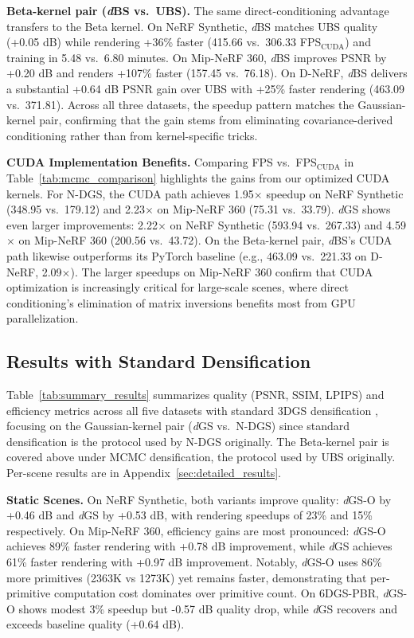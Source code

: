 \documentclass{article}
\newcommand{\dgs}{\textit{d}GS\xspace}
\newcommand{\dbs}{\textit{d}BS\xspace}
\theoremstyle{plain}
\theoremstyle{definition}
\theoremstyle{remark}
\begin{document}
\textbf{Beta-kernel pair (\dbs{} vs.\ UBS).} The same direct-conditioning advantage transfers to the Beta kernel. On NeRF Synthetic, \dbs{} matches UBS quality (+0.05 dB) while rendering +36\% faster (415.66 vs.\ 306.33 FPS$_{\text{CUDA}}$) and training in 5.48 vs.\ 6.80 minutes. On Mip-NeRF 360, \dbs{} improves PSNR by +0.20 dB and renders +107\% faster (157.45 vs.\ 76.18). On D-NeRF, \dbs{} delivers a substantial +0.64 dB PSNR gain over UBS with +25\% faster rendering (463.09 vs.\ 371.81). Across all three datasets, the speedup pattern matches the Gaussian-kernel pair, confirming that the gain stems from eliminating covariance-derived conditioning rather than from kernel-specific tricks.

\textbf{CUDA Implementation Benefits.} Comparing FPS vs.\ FPS$_{\text{CUDA}}$ in Table~\ref{tab:mcmc_comparison} highlights the gains from our optimized CUDA kernels. For N-DGS, the CUDA path achieves 1.95$\times$ speedup on NeRF Synthetic (348.95 vs.\ 179.12) and 2.23$\times$ on Mip-NeRF 360 (75.31 vs.\ 33.79). \dgs{} shows even larger improvements: 2.22$\times$ on NeRF Synthetic (593.94 vs.\ 267.33) and 4.59$\times$ on Mip-NeRF 360 (200.56 vs.\ 43.72). On the Beta-kernel pair, \dbs{}'s CUDA path likewise outperforms its PyTorch baseline (e.g., 463.09 vs.\ 221.33 on D-NeRF, 2.09$\times$). The larger speedups on Mip-NeRF 360 confirm that CUDA optimization is increasingly critical for large-scale scenes, where direct conditioning's elimination of matrix inversions benefits most from GPU parallelization.

\subsection{Results with Standard Densification}

Table~\ref{tab:summary_results} summarizes quality (PSNR, SSIM, LPIPS) and efficiency metrics across all five datasets with standard 3DGS densification \citep{3dgs}, focusing on the Gaussian-kernel pair (\dgs{} vs.\ N-DGS) since standard densification is the protocol used by N-DGS originally. The Beta-kernel pair is covered above under MCMC densification, the protocol used by UBS originally. Per-scene results are in Appendix~\ref{sec:detailed_results}.

\textbf{Static Scenes.}
On NeRF Synthetic, both variants improve quality: \textit{d}GS-O by +0.46 dB and \textit{d}GS by +0.53 dB, with rendering speedups of 23\% and 15\% respectively. On Mip-NeRF 360, efficiency gains are most pronounced: \textit{d}GS-O achieves 89\% faster rendering with +0.78 dB improvement, while \textit{d}GS achieves 61\% faster rendering with +0.97 dB improvement. Notably, \textit{d}GS-O uses 86\% more primitives (2363K vs 1273K) yet remains faster, demonstrating that per-primitive computation cost dominates over primitive count. On 6DGS-PBR, \textit{d}GS-O shows modest 3\% speedup but -0.57 dB quality drop, while \textit{d}GS recovers and exceeds baseline quality (+0.64 dB).
\end{document}
